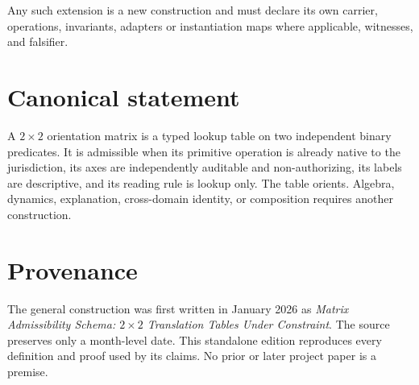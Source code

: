 \documentclass[11pt]{article}
\begin{document}
Any such extension is a new construction and must declare its own carrier, operations, invariants, adapters or instantiation maps where applicable, witnesses, and falsifier.

\section{Canonical statement}

\begin{lawbox}
A $2\times2$ orientation matrix is a typed lookup table on two independent binary predicates. It is admissible when its primitive operation is already native to the jurisdiction, its axes are independently auditable and non-authorizing, its labels are descriptive, and its reading rule is lookup only. The table orients. Algebra, dynamics, explanation, cross-domain identity, or composition requires another construction.
\end{lawbox}

\section*{Provenance}

The general construction was first written in January 2026 as \emph{Matrix Admissibility Schema: $2\times2$ Translation Tables Under Constraint}. The source preserves only a month-level date. This standalone edition reproduces every definition and proof used by its claims. No prior or later project paper is a premise.
\end{document}

